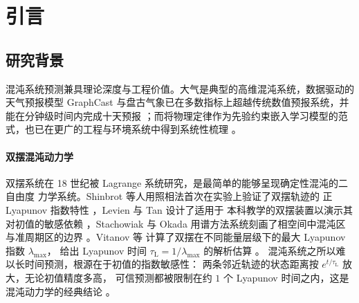 \documentclass[a4paper,12pt]{ctexart}   %
\let\cite\supercite   %
\newcommand{\tauL}{\tau_{\mathrm{L}}}              %
\begin{document}
\begin{abstract}
{High-fidelity physical modeling together with physics-informed
constraints substantially extend the trustworthy prediction window for chaotic systems in
low-cost experimental conditions, with the physics loss's value emerging precisely under
sim$\to$real distribution shift, providing a feasible pathway for ML-assisted dynamics
prediction on undergraduate-lab-grade hardware.

\textbf{Keywords:} double pendulum; chaos; physics-informed neural network;
echo state network; Lyapunov time
\par}
\end{abstract}

\newpage
{\hypersetup{linkcolor=black}\tableofcontents}
\newpage

\section{引言}
\label{sec:intro}

\subsection{研究背景}

混沌系统预测兼具理论深度与工程价值。大气是典型的高维混沌系统，数据驱动的天气预报模型 GraphCast 与盘古气象已在多数指标上超越传统数值预报系统，并能在分钟级时间内完成十天预报 \cite{lam2023graphcast,bi2023pangu}；而将物理定律作为先验约束嵌入学习模型的范式，也已在更广的工程与环境系统中得到系统性梳理 \cite{willard2022integrating}。

\paragraph{双摆混沌动力学}
双摆系统在 18 世纪被 Lagrange 系统研究，是最简单的能够呈现确定性混沌的二自由度
力学系统。Shinbrot 等人用照相法首次在实验上验证了双摆轨迹的
正 Lyapunov 指数特性 \cite{shinbrot1992}，Levien 与 Tan 设计了适用于
本科教学的双摆装置以演示其对初值的敏感依赖 \cite{levien1993pendulum}，Stachowiak 与 Okada
用谱方法系统刻画了相空间中混沌区与准周期区的边界 \cite{stachowiak2006chaotic}。Vitanov 等
计算了双摆在不同能量层级下的最大 Lyapunov 指数 $\lambda_{\max}$，
给出 Lyapunov 时间 $\tauL = 1 / \lambda_{\max}$ 的解析估算 \cite{vitanov2010lyapunov}。
混沌系统之所以难以长时间预测，根源在于初值的指数敏感性：
两条邻近轨迹的状态距离按 $e^{t / \tauL}$ 放大，无论初值精度多高，
可信预测都被限制在约 $1$ 个 Lyapunov 时间之内，这是混沌动力学的经典结论 \cite{ott2002}。
\end{document}
